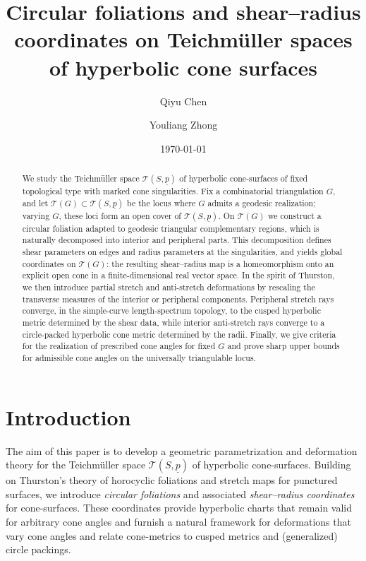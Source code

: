 \documentclass[11pt, letterpaper]{amsart}
\author[Qiyu Chen]{Qiyu Chen}
\author{Youliang Zhong}
\date{\today}
\title[Circular foliations and shear--radius coordinates]{Circular foliations and shear--radius coordinates on Teichm\"uller spaces of hyperbolic cone surfaces}
\theoremstyle{definition}
\theoremstyle{remark}
\newcommand{\up}{\underline{p}}
\newcommand{\cT}{\mathcal{T}}
\newcommand{\cTp}{\mathcal{T} (S,\up)}
\numberwithin{equation}{section}
\begin{document}
\begin{abstract}
We study the Teichm\"uller space \(\cT(S,\underline{p})\) of hyperbolic cone-surfaces of fixed topological type with marked cone singularities.
Fix a combinatorial triangulation \(G\), and let \(\cT(G)\subset \cT(S,\underline{p})\) be the locus where \(G\) admits a geodesic realization; varying \(G\), these loci form an open cover of \(\cT(S,\underline{p})\).
On \(\cT(G)\) we construct a circular foliation adapted to geodesic triangular complementary regions, which is naturally decomposed into interior and peripheral parts.
This decomposition defines shear parameters on edges and radius parameters at the singularities, and yields global coordinates on \(\cT(G)\): the resulting shear--radius map is a homeomorphism onto an explicit open cone in a finite-dimensional real vector space.
In the spirit of Thurston, we then introduce partial stretch and anti-stretch deformations by rescaling the transverse measures of the interior or peripheral components.
Peripheral stretch rays converge, in the simple-curve length-spectrum topology, to the cusped hyperbolic metric determined by the shear data, while interior anti-stretch rays converge to a circle-packed hyperbolic cone metric determined by the radii.
Finally, we give criteria for the realization of prescribed cone angles for fixed \(G\) and prove sharp upper bounds for admissible cone angles on the universally triangulable locus.
\end{abstract}

















 \maketitle
\tableofcontents
\section{Introduction}
\label{sec:intro}

The aim of this paper is to develop a geometric parametrization and deformation theory for the Teichm\"uller space \(\cTp\) of hyperbolic cone-surfaces.
Building on Thurston's theory of horocyclic foliations and stretch maps for punctured surfaces, we introduce \emph{circular foliations} and associated \emph{shear--radius coordinates} for cone-surfaces.
These coordinates provide hyperbolic charts that remain valid for arbitrary cone angles and furnish a natural framework for deformations that vary cone angles and relate cone-metrics to cusped metrics and (generalized) circle packings.
\end{document}
